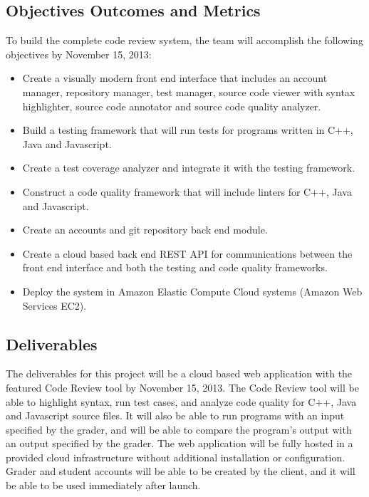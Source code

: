
\subsection{Objectives Outcomes and Metrics}
To build the complete code review system, the team will accomplish the following
objectives by November 15, 2013:

\begin{itemize}
\item Create a visually modern front end interface that includes an account
manager, repository manager, test manager, source code viewer with syntax
highlighter, source code annotator and source code quality analyzer.

\item Build a testing framework that will run tests for programs written in C++,
Java and Javascript.

\item Create a test coverage analyzer and integrate it with the testing
framework.

\item Construct a code quality framework that will include linters for C++, Java
and Javascript.

\item Create an accounts and git repository back end module.

\item Create a cloud based back end REST API for communications between the
front end interface and both the testing and code quality frameworks.

\item Deploy the system in Amazon Elastic Compute Cloud systems (Amazon Web
Services EC2).

\end{itemize}
\subsection{Deliverables}

The deliverables for this project will be a cloud based web application with the
featured Code Review tool by November 15, 2013. The Code Review tool will be
able to highlight syntax, run test cases, and analyze code quality for C++, Java
and Javascript source files. It will also be able to run programs with an input
specified by the grader, and will be able to compare the program's output with
an output specified by the grader. The web application will be fully hosted in a
provided cloud infrastructure without additional installation or configuration.
Grader and student accounts will be able to be created by the client, and it
will be able to be used immediately after launch.

